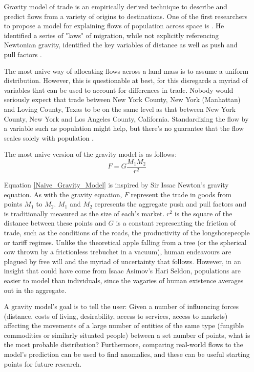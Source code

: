 Gravity model of trade is an empirically derived technique to describe and predict flows from a variety of origins to destinations.  One of the first researchers to propose a model for explaining flows of population across space is  \cite{ravenstein1885laws}. He identified a series of "laws" of migration, while not explicitly referencing Newtonian gravity, identified the key variables of distance as well as push and pull factors \citep{Tobler1995}.  

The most naive way of allocating flows across a land mass is to assume a uniform distribution.  However, this is questionable at best, for this disregards a myriad of variables that can be used to account for differences in trade.  Nobody would seriously expect that trade between New York County, New York (Manhattan) and Loving County, Texas to be on the same level as that between New York County, New York and Los Angeles County, California.  Standardizing the flow by a variable such as population might help, but there's no guarantee that the flow scales solely with population \citep{Crymble19}.   

The most naive version of the gravity model is as follows:
\begin{equation}
F = G \frac{M_{1}M_{2}}{r^{2}}
\label{Naive_Gravity_Model}
\end{equation}  

Equation \ref{Naive_Gravity_Model} is inspired by Sir Issac Newton's gravity equation.  As with the gravity equation, $F$ represent the trade in goods from points $M_{1}$ to $M_{2}$. $M_{1}$ and $M_{2}$ represents the aggregate push and pull factors and is traditionally measured as the size of each's market. $r^{2}$ is the square of the distance between these points and $G$ is a constant representing the friction of trade, such as the conditions of the roads, the productivity of the longshorepeople or tariff regimes.  Unlike the theoretical apple falling from a tree (or the spherical cow thrown by a frictionless trebuchet in a vacuum), human endeavours are plagued by free will and the myriad of uncertainty that follows.  However, in an insight that could have come from Isaac Asimov's Hari Seldon, populations are easier to model than individuals, since the vagaries of human existence averages out in the aggregate.  

A gravity model's goal is to tell the user: Given a number of influencing forces (distance, costs of living, desirability, access to services, access to markets) affecting the movements of a large number of entities of the same type (fungible commodities or similarly situated people) between a set number of points, what is the most probable distribution?  Furthermore, comparing real-world flows to the model's prediction can be used to find anomalies, and these can be useful starting points for future research\citep{Crymble19}.  

